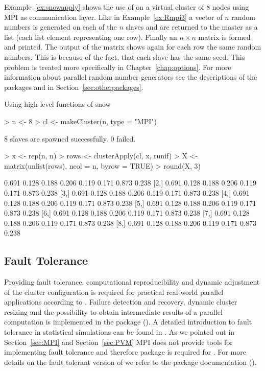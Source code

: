 Example~\ref{ex:snowapply} shows the use of  on a
virtual cluster of 8 nodes using MPI as communication layer. Like in
Example~\ref{ex:Rmpi3} a vector of $n$ random numbers is generated on
each of the $n$ slaves and are returned to the master as a
list (each list element representing one row). Finally an $n  \times n$
matrix is formed and printed. The output of the matrix shows again for
each row the same random numbers. This is because of the fact, that
each slave has the same seed. This problem is treated more specifically in
Chapter~\ref{chap:options}. For more information about parallel random
number generators see the descriptions of the packages 
and  in Section~\ref{sec:otherpackages}. 
\newpage
\begin{Example} Using high level functions of snow
\begin{Schunk}
\begin{Sinput}
> n <- 8
> cl <- makeCluster(n, type = "MPI")
\end{Sinput}
\begin{Soutput}
	8 slaves are spawned successfully. 0 failed.
\end{Soutput}
\begin{Sinput}
> x <- rep(n, n)
> rows <- clusterApply(cl, x, runif)
> X <- matrix(unlist(rows), ncol = n, byrow = TRUE)
> round(X, 3)
\end{Sinput}
\begin{Soutput}
      [,1]  [,2]  [,3]  [,4]  [,5]  [,6]  [,7]  [,8]
[1,] 0.691 0.128 0.188 0.206 0.119 0.171 0.873 0.238
[2,] 0.691 0.128 0.188 0.206 0.119 0.171 0.873 0.238
[3,] 0.691 0.128 0.188 0.206 0.119 0.171 0.873 0.238
[4,] 0.691 0.128 0.188 0.206 0.119 0.171 0.873 0.238
[5,] 0.691 0.128 0.188 0.206 0.119 0.171 0.873 0.238
[6,] 0.691 0.128 0.188 0.206 0.119 0.171 0.873 0.238
[7,] 0.691 0.128 0.188 0.206 0.119 0.171 0.873 0.238
[8,] 0.691 0.128 0.188 0.206 0.119 0.171 0.873 0.238
\end{Soutput}
\end{Schunk}
\label{ex:snowapply}
\end{Example}

\subsection{Fault Tolerance}

Providing fault tolerance, computational reproducibility and dynamic
adjustment of the cluster configuration is required for practical
real-world parallel applications according to
\cite{sevcikova04pragmatic}. Failure detection and recovery, dynamic
cluster resizing and the possibility to obtain intermediate results of
a parallel computation is implemented in the package 
(\cite{sevcikova04snowFT}). A detailed introduction to fault tolerance
in statistical simulations can be found in
\cite{sevcikova04simulations}. As we pointed out in
Section~\ref{sec:MPI} and Section~\ref{sec:PVM} MPI does not provide
tools for implementing fault tolerance and therefore package
 is required for . For more details on the fault
tolerant version of  we refer to the package documentation
(\cite{sevcikova04snowFT}).

